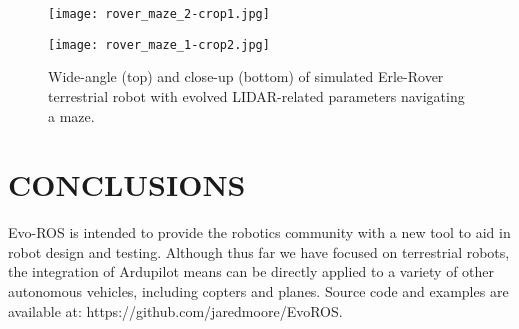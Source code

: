\documentclass[letterpaper, 10 pt, journal]{ieeeconf}  %
\begin{document}
\begin{figure}[htb]
\centering
\texttt{[image: rover\_maze\_2-crop1.jpg]}

\vspace{0.1in}
\texttt{[image: rover\_maze\_1-crop2.jpg]}
\caption{Wide-angle (top) and close-up (bottom) of simulated Erle-Rover terrestrial robot with evolved LIDAR-related parameters navigating a maze.}
\label{f:erlerover}
\end{figure}

\vspace{-0.2in}
\section{CONCLUSIONS}
Evo-ROS is intended to provide the robotics community with a new tool to aid in robot design and testing.
%
Although thus far we have focused on terrestrial robots, the integration of Ardupilot means {\project} can be directly applied to a variety of other autonomous vehicles, including copters and planes.
Source code and examples are available at: https://github.com/jaredmoore/EvoROS.
%

\begin{small}

% 

\end{small}
\end{document}
